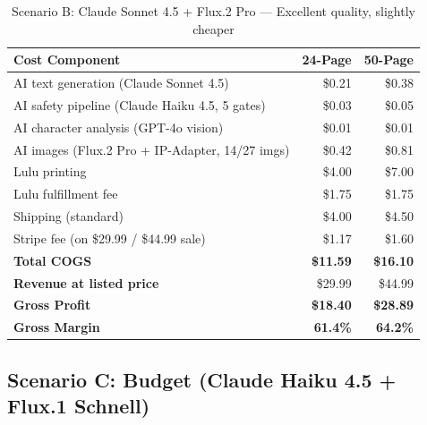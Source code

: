 \documentclass[12pt, letterpaper, oneside]{book}
\begin{document}
\begin{table}[H]
\centering
\begin{tabular}{lrr}
\toprule
\textbf{Cost Component} & \textbf{24-Page} & \textbf{50-Page} \\
\midrule
AI text generation (Claude Sonnet 4.5) & \$0.21 & \$0.38 \\
AI safety pipeline (Claude Haiku 4.5, 5 gates) & \$0.03 & \$0.05 \\
AI character analysis (GPT-4o vision) & \$0.01 & \$0.01 \\
AI images (Flux.2 Pro + IP-Adapter, 14/27 imgs) & \$0.42 & \$0.81 \\
Lulu printing & \$4.00 & \$7.00 \\
Lulu fulfillment fee & \$1.75 & \$1.75 \\
Shipping (standard) & \$4.00 & \$4.50 \\
Stripe fee (on \$29.99 / \$44.99 sale) & \$1.17 & \$1.60 \\
\midrule
\textbf{Total COGS} & \textbf{\$11.59} & \textbf{\$16.10} \\
\textbf{Revenue at listed price} & \$29.99 & \$44.99 \\
\textbf{Gross Profit} & \textcolor{success}{\textbf{\$18.40}} & \textcolor{success}{\textbf{\$28.89}} \\
\textbf{Gross Margin} & \textcolor{success}{\textbf{61.4\%}} & \textcolor{success}{\textbf{64.2\%}} \\
\bottomrule
\end{tabular}
\caption{Scenario B: Claude Sonnet 4.5 + Flux.2 Pro --- Excellent quality, slightly cheaper}
\end{table}

\subsection{Scenario C: Budget (Claude Haiku 4.5 + Flux.1 Schnell)}
\end{document}
